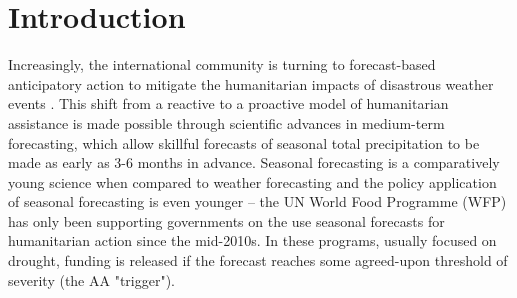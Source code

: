 \documentclass{ametsocV6.1}
\begin{document}






\section{Introduction}

Increasingly, the international community is turning to forecast-based anticipatory action to mitigate the humanitarian impacts of disastrous weather events \citep{world_food_programme_10_2024}. This shift from a reactive to a proactive model of humanitarian assistance is made possible through scientific advances in medium-term forecasting, which allow skillful forecasts of seasonal total precipitation to be made as early as 3-6 months in advance. Seasonal forecasting is a comparatively young science when compared to weather forecasting and the policy application of seasonal forecasting is even younger -- the UN World Food Programme (WFP) has only been supporting governments on the use seasonal forecasts for humanitarian action since the mid-2010s. In these programs, usually focused on drought, funding is released if the forecast reaches some agreed-upon threshold of severity (the AA "trigger"). 
\end{document}
